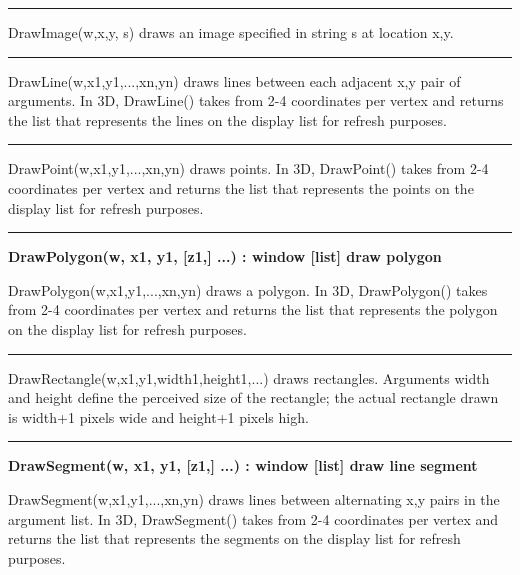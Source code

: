 \bigskip\hrule\vspace{0.1cm}

\noindent
\textsf{DrawImage(w,x,y, s)} draws an image specified in string
\textsf{s} at location \textsf{x,y}.

\bigskip\hrule\vspace{0.1cm}

\noindent
\textsf{DrawLine(w,x1,y1,...,xn,yn)} draws lines between each adjacent
\textsf{x,y} pair of arguments. In 3D, \textsf{DrawLine()} takes from
2-4 coordinates per vertex and returns the list that represents the
lines on the display list for refresh purposes.

\bigskip\hrule\vspace{0.1cm}

\noindent
\textsf{DrawPoint(w,x1,y1,...,xn,yn)} draws points. In 3D,
\textsf{DrawPoint()} takes from 2-4 coordinates per vertex and returns
the list that represents the points on the display list for refresh
purposes.

\bigskip\hrule\vspace{0.1cm}
\noindent
{\bf DrawPolygon(w, x1, y1, [z1,] ...) : window [list] \hfill draw polygon}

\noindent
\textsf{DrawPolygon(w,x1,y1,...,xn,yn)} draws a polygon. In 3D\textsf{,
DrawPolygon()} takes from 2-4 coordinates per vertex and returns the
list that represents the polygon on the display list for refresh
purposes.

\bigskip\hrule\vspace{0.1cm}

\noindent
\textsf{DrawRectangle(w,x1,y1,width1,height1,...)} draws rectangles.
Arguments \textsf{width} and \textsf{height} define the perceived size
of the rectangle; the actual rectangle drawn is \textsf{width+1} pixels
wide and \textsf{height+1} pixels high.

\bigskip\hrule\vspace{0.1cm}
\noindent
{\bf DrawSegment(w, x1, y1, [z1,] ...) : window [list] \hfill draw line segment}

\noindent
\textsf{DrawSegment(w,x1,y1,...,xn,yn)} draws lines between alternating
\textsf{x,y} pairs in the argument list. In 3D, \textsf{DrawSegment()}
takes from 2-4 coordinates per vertex and returns the list that
represents the segments on the display list for refresh purposes.

